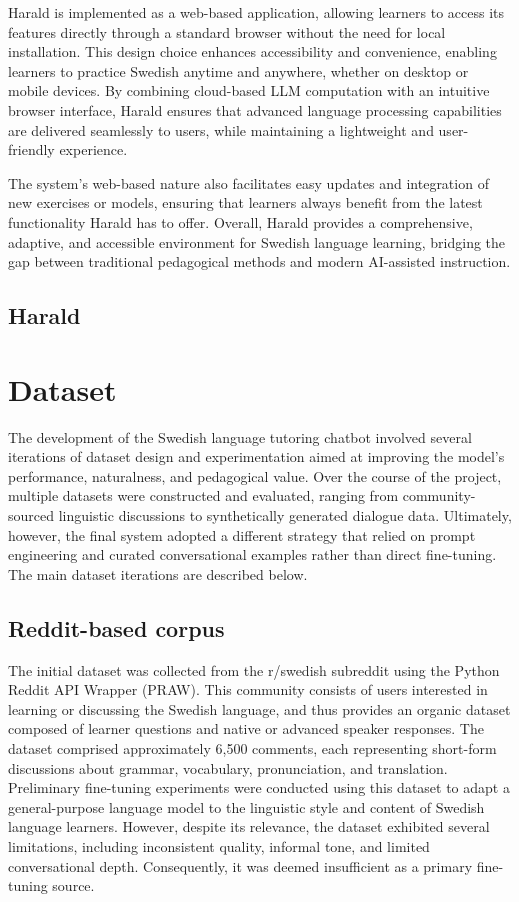 \documentclass[a4paper,10pt]{article}
\begin{document}
Harald is implemented as a web-based application, allowing learners to access its features directly through a standard browser without the need for local installation. This design choice enhances accessibility and convenience, enabling learners to practice Swedish anytime and anywhere, whether on desktop or mobile devices. By combining cloud-based LLM computation with an intuitive browser interface, Harald ensures that advanced language processing capabilities are delivered seamlessly to users, while maintaining a lightweight and user-friendly experience.

The system’s web-based nature also facilitates easy updates and integration of new exercises or models, ensuring that learners always benefit from the latest functionality Harald has to offer. Overall, Harald provides a comprehensive, adaptive, and accessible environment for Swedish language learning, bridging the gap between traditional pedagogical methods and modern AI-assisted instruction.

\subsection{Harald}

\section{Dataset}

The development of the Swedish language tutoring chatbot involved several iterations of dataset design and experimentation aimed at improving the model’s performance, naturalness, and pedagogical value. Over the course of the project, multiple datasets were constructed and evaluated, ranging from community-sourced linguistic discussions to synthetically generated dialogue data. Ultimately, however, the final system adopted a different strategy that relied on prompt engineering and curated conversational examples rather than direct fine-tuning. The main dataset iterations are described below.

\subsection{Reddit-based corpus}
The initial dataset was collected from the r/swedish subreddit using the Python Reddit API Wrapper (PRAW). This community consists of users interested in learning or discussing the Swedish language, and thus provides an organic dataset composed of learner questions and native or advanced speaker responses. The dataset comprised approximately 6,500 comments, each representing short-form discussions about grammar, vocabulary, pronunciation, and translation. Preliminary fine-tuning experiments were conducted using this dataset to adapt a general-purpose language model to the linguistic style and content of Swedish language learners. However, despite its relevance, the dataset exhibited several limitations, including inconsistent quality, informal tone, and limited conversational depth. Consequently, it was deemed insufficient as a primary fine-tuning source.
\end{document}
